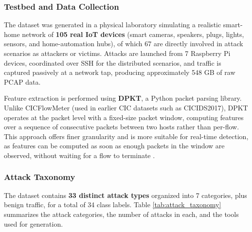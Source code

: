 \subsubsection{Testbed and Data Collection}
\label{subsec:testbed}

\par The dataset was generated in a physical laboratory simulating a realistic smart-home network of \textbf{105 real IoT devices} (smart cameras, speakers, plugs, lights, sensors, and home-automation hubs), of which 67 are directly involved in attack scenarios as attackers or victims. Attacks are launched from 7 Raspberry Pi devices, coordinated over SSH for the distributed scenarios, and traffic is captured passively at a network tap, producing approximately 548 GB of raw PCAP data.

\par Feature extraction is performed using \textbf{DPKT}, a Python packet parsing library. Unlike CICFlowMeter (used in earlier CIC datasets such as CICIDS2017), DPKT operates at the packet level with a fixed-size packet window, computing features over a sequence of consecutive packets between two hosts rather than per-flow. This approach offers finer granularity and is more suitable for real-time detection, as features can be computed as soon as enough packets in the window are observed, without waiting for a flow to terminate \cite{CICIoT2023}.

\subsubsection{Attack Taxonomy}
\label{subsec:attack_taxonomy}

\par The dataset contains \textbf{33 distinct attack types} organized into 7 categories, plus benign traffic, for a total of 34 class labels. Table \ref{tab:attack_taxonomy} summarizes the attack categories, the number of attacks in each, and the tools used for generation.

